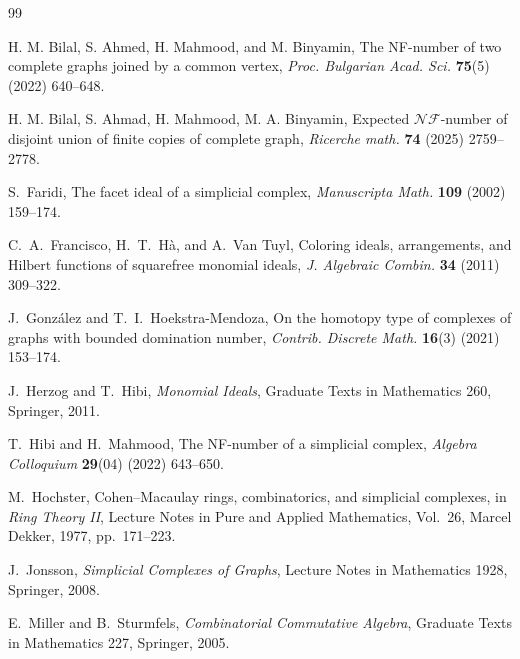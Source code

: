\documentclass[12pt]{article}
\theoremstyle{plain}
\theoremstyle{definition}
\begin{document}
	\begin{thebibliography}{99}
		
		 H. M. Bilal, S. Ahmed, H. Mahmood, and M. Binyamin,  The NF-number of two complete graphs joined by a common vertex, \textit{Proc. Bulgarian Acad. Sci.} \textbf{75}(5) (2022) 640--648.
		
		 H. M. Bilal, S. Ahmad, H. Mahmood, M. A. Binyamin, Expected  $\mathcal{NF}$-number of disjoint union of finite copies of complete graph, \textit{Ricerche math.} \textbf{74} (2025) 2759--2778.
		
		
		
		
		S.~Faridi,
		\newblock The facet ideal of a simplicial complex,
		\newblock \emph{Manuscripta Math.} \textbf{109} (2002) 159--174.
		
		
		C.~A.~Francisco, H.~T.~H\`a, and A.~Van Tuyl,
		\newblock Coloring ideals, arrangements, and $\mathrm{Hilbert}$ functions of squarefree monomial ideals,
		\newblock \emph{J. Algebraic Combin.} \textbf{34} (2011) 309--322.
		
		J.~Gonz\'alez and T.~I.~Hoekstra-Mendoza,
		\newblock On the homotopy type of complexes of graphs with bounded domination number,
		\newblock \emph{Contrib. Discrete Math.} \textbf{16}(3) (2021) 153--174.
		
		
		
		J.~Herzog and T.~Hibi,
		\newblock \emph{Monomial Ideals},
		\newblock Graduate Texts in Mathematics 260, Springer, 2011.
		
		T.~Hibi and H.~Mahmood,
		\newblock The NF-number of a simplicial complex,
		\newblock \textit{Algebra Colloquium} \textbf{29}(04) (2022) 643--650.
		
		M.~Hochster,
		\newblock Cohen--Macaulay rings, combinatorics, and simplicial complexes,
		\newblock in \emph{Ring Theory II}, Lecture Notes in Pure and Applied Mathematics, Vol.~26, Marcel Dekker, 1977, pp.~171--223.
		
		J.~Jonsson,
		\newblock \emph{Simplicial Complexes of Graphs},
		\newblock Lecture Notes in Mathematics 1928, Springer, 2008.
		
		E.~Miller and B.~Sturmfels,
		\newblock \emph{Combinatorial Commutative Algebra},
		\newblock Graduate Texts in Mathematics 227, Springer, 2005.
		

\end{thebibliography}
\end{document}
